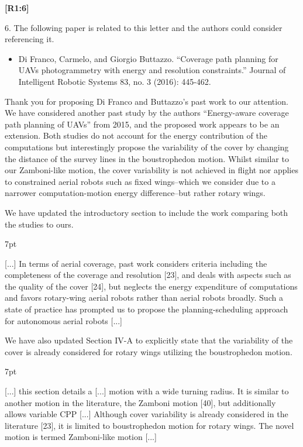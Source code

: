 \documentclass[10pt]{letter}
\newenvironment{formal}{%
  \def\FrameCommand{%
    \hspace{1pt}%
    {\color{red}\vrule width 2pt}%
    {\color{formalshade}\vrule width 4pt}%
    \colorbox{formalshade}%
  }%
  \MakeFramed{\advance\hsize-\width\FrameRestore}%
  \noindent\hspace{-4.55pt}%
  \begin{adjustwidth}{}{7pt}%
  \vspace{2pt}\vspace{2pt}%
}
{%
  \vspace{2pt}\end{adjustwidth}\endMakeFramed%
}
\begin{document}
{\hspace*{-4.5em}\textbf{[R1:6]}\vspace*{-1.9em}}

6. The following paper is related to this letter and the authors could consider referencing it.
\begin{itemize}
  \item Di Franco, Carmelo, and Giorgio Buttazzo. ``Coverage path planning for UAVs photogrammetry with energy and resolution constraints.'' Journal of Intelligent Robotic Systems 83, no. 3 (2016): 445-462.
\end{itemize}

{\color{blue} 

{\hspace*{-4.5em}{[R1:6]}\vspace*{-1.9em}}

Thank you for proposing Di Franco and Buttazzo's past work to our attention. We have considered another past study by the authors ``Energy-aware coverage path planning of UAVs'' from 2015, and the proposed work appears to be an extension. Both studies do not account for the energy contribution of the computations but interestingly propose the variability of the cover by changing the distance of the survey lines in the boustrophedon motion. Whilst similar to our Zamboni-like motion, the cover variability is not achieved in flight nor applies to constrained aerial robots such as fixed wings--which we consider due to a narrower computation-motion energy difference--but rather rotary wings.

We have updated the introductory section to include the work comparing both the studies to ours.

\begin{formal}
  \color{black} [...] {\color{blue}In terms of aerial coverage, past work considers criteria including the completeness of the coverage and resolution [{\color{green}23}], and deals with aspects such as the quality of the cover [{\color{green}24}], but neglects the energy expenditure of computations and favors rotary-wing aerial robots rather than aerial robots broadly.} Such a state of practice has prompted us to propose the planning-scheduling approach for autonomous aerial robots [...]
  \vspace*{1ex}
\end{formal}

We have also updated Section IV-A to explicitly state that the variability of the cover is already considered for rotary wings utilizing the boustrophedon motion.

\begin{formal}
  \color{black} [...] this section details a [...] motion with a wide turning radius. It is similar to another motion in the literature, the Zamboni
  motion [{\color{green}40}], but additionally allows variable CPP [...] {\color{blue} Although cover variability is already considered in the literature [{\color{green}23}], it is limited to boustrophedon motion for rotary wings.} The novel motion is termed Zamboni-like motion [...]
  \vspace*{1ex}
\end{formal}
}
\end{document}
